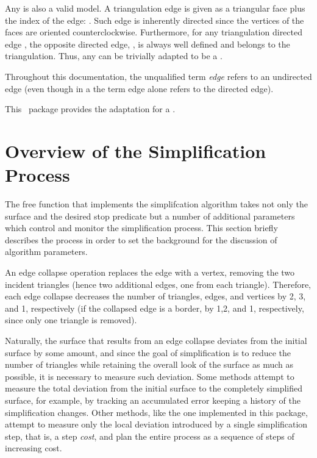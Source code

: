 Any  is also a valid  model. A triangulation edge is given as a triangular face  plus the index of the edge: . Such edge is inherently directed since the vertices of the faces are oriented counterclockwise. Furthermore, for any triangulation directed edge , the opposite directed edge, , is always well defined and belongs to the triangulation. Thus, any  can be trivially adapted to be a . 

Throughout this documentation, the unqualified term {\em edge} refers to an undirected edge (even though in a  the term edge alone refers to the directed edge).

This \cgal\ package provides the adaptation for a .

\section{Overview of the Simplification Process}

The free function that implements the simplifcation algorithm takes not only the surface and the desired stop predicate but a number of additional parameters which control and monitor the simplification process. This section briefly describes the process in order to set the background for the discussion of algorithm parameters.

An edge collapse operation replaces the edge with a vertex, removing the two incident triangles (hence two additional edges, one from each triangle). Therefore, each edge collapse decreases the number of triangles, edges, and vertices by 2, 3, and 1, respectively (if the collapsed edge is a border, by 1,2, and 1, respectively, since only one triangle is removed).

Naturally, the surface that results from an edge collapse deviates from the initial surface by some amount, and since the goal of simplification is to reduce the number of triangles while retaining the overall look of the surface as much as possible, it is necessary to measure such deviation. Some methods attempt to measure the total deviation from the initial surface to the completely simplified surface, for example, by tracking an accumulated error keeping a history of the simplification changes. Other methods, like the one implemented in this package, attempt to measure only the local deviation introduced by a single simplification step, that is, a step {\em cost}, and plan the entire process as a sequence of steps of increasing cost. 


